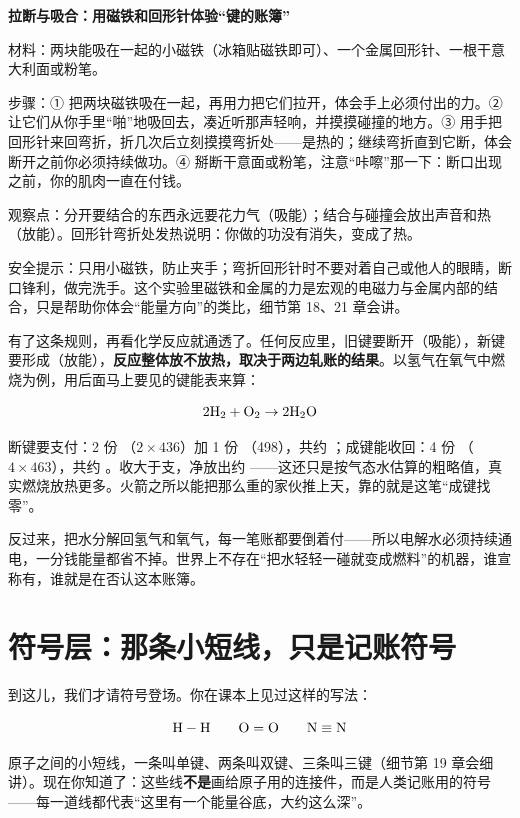 \begin{shiyan}
\textbf{拉断与吸合：用磁铁和回形针体验“键的账簿”}

材料：两块能吸在一起的小磁铁（冰箱贴磁铁即可）、一个金属回形针、一根干意大利面或粉笔。

步骤：① 把两块磁铁吸在一起，再用力把它们拉开，体会手上必须付出的力。② 让它们从你手里“啪”地吸回去，凑近听那声轻响，并摸摸碰撞的地方。③ 用手把回形针来回弯折，折几次后立刻摸摸弯折处——是热的；继续弯折直到它断，体会断开之前你必须持续做功。④ 掰断干意面或粉笔，注意“咔嚓”那一下：断口出现之前，你的肌肉一直在付钱。

观察点：分开要结合的东西永远要花力气（吸能）；结合与碰撞会放出声音和热（放能）。回形针弯折处发热说明：你做的功没有消失，变成了热。

安全提示：只用小磁铁，防止夹手；弯折回形针时不要对着自己或他人的眼睛，断口锋利，做完洗手。这个实验里磁铁和金属的力是宏观的电磁力与金属内部的结合，只是帮助你体会“能量方向”的类比，细节第 18、21 章会讲。
\end{shiyan}

有了这条规则，再看化学反应就通透了。任何反应里，旧键要断开（吸能），新键要形成（放能），\textbf{反应整体放不放热，取决于两边轧账的结果}。以氢气在氧气中燃烧为例，用后面马上要见的键能表来算：

\[ \mathrm{2H_2} + \mathrm{O_2} \rightarrow \mathrm{2H_2O} \]

断键要支付：2 份 （$2\times 436$）加 1 份 （498），共约 ；成键能收回：4 份 （$4\times 463$），共约 。收大于支，净放出约 ——这还只是按气态水估算的粗略值，真实燃烧放热更多。火箭之所以能把那么重的家伙推上天，靠的就是这笔“成键找零”。

反过来，把水分解回氢气和氧气，每一笔账都要倒着付——所以电解水必须持续通电，一分钱能量都省不掉。世界上不存在“把水轻轻一碰就变成燃料”的机器，谁宣称有，谁就是在否认这本账簿。

\section{符号层：那条小短线，只是记账符号}

到这儿，我们才请符号登场。你在课本上见过这样的写法：

\[ \mathrm{H-H} \qquad \mathrm{O=O} \qquad \mathrm{N\equiv N} \]

原子之间的小短线，一条叫单键、两条叫双键、三条叫三键（细节第 19 章会细讲）。现在你知道了：这些线\textbf{不是}画给原子用的连接件，而是人类记账用的符号——每一道线都代表“这里有一个能量谷底，大约这么深”。

